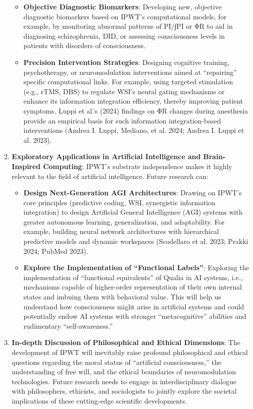 \documentclass[
  a4paper]{article}
\providecommand{\tightlist}{%
  \setlength{\itemsep}{0pt}\setlength{\parskip}{0pt}}
\begin{document}
\begin{enumerate}
  \begin{itemize}
  \tightlist
  \item
    \textbf{Objective Diagnostic Biomarkers}: Developing new, objective
    diagnostic biomarkers based on IPWT's computational models, for
    example, by monitoring abnormal patterns of PI/∫PI or ΦR to aid in
    diagnosing schizophrenia, DID, or assessing consciousness levels in
    patients with disorders of consciousness.
  \item
    \textbf{Precision Intervention Strategies}: Designing cognitive
    training, psychotherapy, or neuromodulation interventions aimed at
    ``repairing'' specific computational links. For example, using
    targeted stimulation (e.g., rTMS, DBS) to regulate WSI's neural
    gating mechanisms or enhance its information integration efficiency,
    thereby improving patient symptoms. Luppi et al.'s (2024) findings
    on ΦR changes during anesthesia provide an empirical basis for such
    information integration-based interventions (Andrea I. Luppi,
    Mediano, et al. 2024; Andrea I. Luppi et al. 2023).
  \end{itemize}
\item
  \textbf{Exploratory Applications in Artificial Intelligence and
  Brain-Inspired Computing}: IPWT's substrate independence makes it
  highly relevant to the field of artificial intelligence. Future
  research can:

  \begin{itemize}
  \tightlist
  \item
    \textbf{Design Next-Generation AGI Architectures}: Drawing on IPWT's
    core principles (predictive coding, WSI, synergistic information
    integration) to design Artificial General Intelligence (AGI) systems
    with greater autonomous learning, generalization, and adaptability.
    For example, building neural network architectures with hierarchical
    predictive models and dynamic workspaces (Scodellaro et al. 2023;
    Prakki 2024; PubMed 2023).
  \item
    \textbf{Explore the Implementation of ``Functional Labels''}:
    Exploring the implementation of ``functional equivalents'' of Qualia
    in AI systems, i.e., mechanisms capable of higher-order
    representation of their own internal states and imbuing them with
    behavioral value. This will help us understand how consciousness
    might arise in artificial systems and could potentially endow AI
    systems with stronger ``metacognitive'' abilities and rudimentary
    ``self-awareness.''
  \end{itemize}
\item
  \textbf{In-depth Discussion of Philosophical and Ethical Dimensions}:
  The development of IPWT will inevitably raise profound philosophical
  and ethical questions regarding the moral status of ``artificial
  consciousness,'' the understanding of free will, and the ethical
  boundaries of neuromodulation technologies. Future research needs to
  engage in interdisciplinary dialogue with philosophers, ethicists, and
  sociologists to jointly explore the societal implications of these
  cutting-edge scientific developments.
\end{enumerate}
\end{document}

